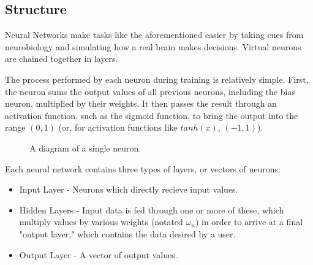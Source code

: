 \documentclass{article}
\begin{document}
\subsection{Structure}
Neural Networks make tasks like the aforementioned easier by taking cues from neurobiology and simulating how a real brain makes decisions. Virtual neurons are chained together in layers.

The process performed by each neuron during training is relatively simple. First, the neuron sums the output values of all previous neurons, including the bias neuron, multiplied by their weights. It then passes the result through an activation function, such as the sigmoid function, to bring the output into the range $(0, 1)$ (or, for activation functions like $tanh(x)$, $(-1, 1)$).

\begin{figure}
\caption{A diagram of a single neuron.} \label{fig:M1}
\end{figure}

Each neural network contains three types of layers, or vectors of neurons:
\begin{itemize}
\item{Input Layer - Neurons which directly recieve input values.}
\item{Hidden Layers - Input data is fed through one or more of these, which multiply values by various weights (notated $\omega_n$) in order to arrive at a final "output layer," which contains the data desired by a user.}
\item{Output Layer - A vector of output values.}
\end{itemize}
\end{document}
